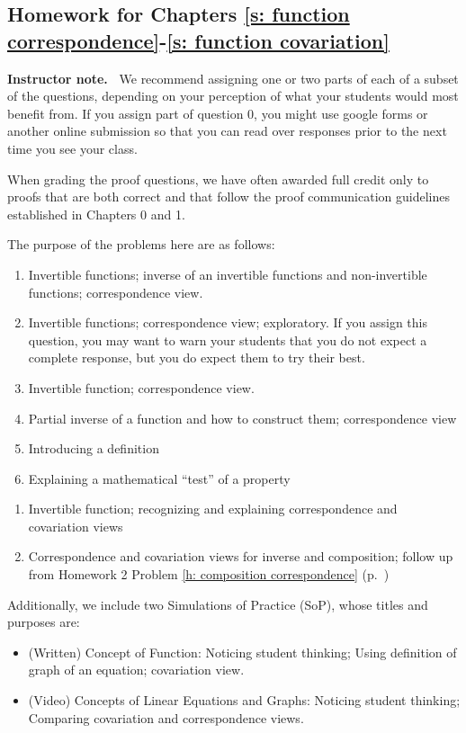 \documentclass[11pt]{article}
\newenvironment{bignote}[1][Instructor note]%
	{\begin{mdframed}\raggedright{\bf #1.~}}
	{\end{mdframed}}
\theoremstyle{definition}
\begin{document}
\newpage \subsection{Homework for Chapters \ref{s: function correspondence}-\ref{s: function covariation}}


\begin{bignote}
We recommend assigning one or two parts of each of a subset of the questions, depending on your perception of what your students would most benefit from. If you assign part of question 0, you might use google forms or another online submission so that you can read over responses prior to the next time you see your class. 

When grading the proof questions, we have often awarded full credit only to proofs that are both correct and that follow the proof communication guidelines established in Chapters 0 and 1. 

The purpose of the problems here are as follows:
	\begin{enumerate}
	\item  Invertible functions; inverse of an invertible functions and non-invertible functions; correspondence view.
	\item Invertible functions; correspondence view; exploratory. If you assign this question, you may want to warn your students that you do not expect a complete response, but you do expect them to try their best.
	\item Invertible function; correspondence view.
	\item Partial inverse of a function and how to construct them; correspondence view
	\item Introducing a definition
	\item Explaining a mathematical ``test'' of a property
	\end{enumerate}
	
	\begin{enumerate}[resume]
	\item Invertible function; recognizing and explaining correspondence and covariation views
	\item Correspondence and covariation views for inverse and composition; follow up from Homework 2 Problem \ref{h: composition correspondence} (p.~\pageref{h: composition correspondence})
	\end{enumerate}
	
Additionally, we include two Simulations of Practice (SoP), whose titles and purposes are:
	\begin{itemize}
	\item (Written) Concept of Function: Noticing student thinking; Using definition of graph of an equation; covariation view.
	\item (Video) Concepts of Linear Equations and Graphs: Noticing student thinking; Comparing covariation and correspondence views.
	\end{itemize}
	

\end{bignote}
\end{document}
